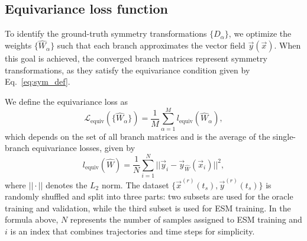 
\subsection{Equivariance loss function}\label{sec:equiv_loss}


To identify the ground-truth symmetry transformations $\{ \hat{D}_{\alpha} \}$, we optimize the weights $\{ \hat{W}_{\alpha} \}$ such that each branch approximates the vector field $\vec{y}(\vec{x})$. When this goal is achieved, the converged branch matrices represent symmetry transformations, as they satisfy the equivariance condition given by Eq.~\ref{eq:sym_def}.

We define the equivariance loss as
\begin{equation}\label{eq:l_equiv}
  \mathcal{L}_{\mathrm{equiv}} \left( \{ \hat{W}_{\alpha} \} \right) = \frac{1}{M} \sum_{\alpha = 1}^{M} l_{\mathrm{equiv}} ( \hat{W}_{ \alpha } ),
\end{equation}
which depends on the set of all branch matrices and is the average of the single-branch equivariance losses, given by
\begin{equation}\label{eq:l_equiv_1}
  l_{\mathrm{equiv}} \left( \hat{W} \right) = \frac{1}{N} \sum_{i=1}^{N} || \vec{y}_i - \vec{y}_{\hat{W}} ( \vec{x}_i  ) ||^2,
\end{equation}
where $|| \cdot ||$ denotes the $L_2$ norm. The dataset $\{ \vec{x}^{(r)}(t_s), \vec{y}^{(r)}(t_s) \}$ is randomly shuffled and split into three parts: two subsets are used for the oracle training and validation, while the third subset is used for ESM training. In the formula above, $N$ represents the number of samples assigned to ESM training and $i$ is an index that combines trajectories and time steps for simplicity.


